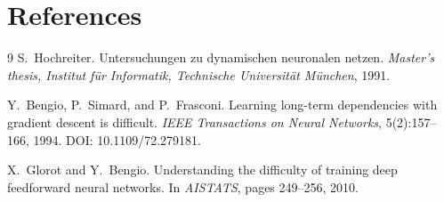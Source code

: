 \documentclass[11pt]{article}
\begin{document}
\section{References}
\label{sec:references}

\begin{thebibliography}{9}
S.~Hochreiter.
\newblock Untersuchungen zu dynamischen neuronalen netzen.
\newblock \emph{Master's thesis, Institut f{\"u}r Informatik, Technische Universit{\"a}t M{\"u}nchen}, 1991.

Y.~Bengio, P.~Simard, and P.~Frasconi.
\newblock Learning long-term dependencies with gradient descent is difficult.
\newblock \emph{IEEE Transactions on Neural Networks}, 5(2):157--166, 1994.
\newblock DOI: 10.1109/72.279181.

X.~Glorot and Y.~Bengio.
\newblock Understanding the difficulty of training deep feedforward neural networks.
\newblock In \emph{AISTATS}, pages 249--256, 2010.
\end{thebibliography}
\end{document}
